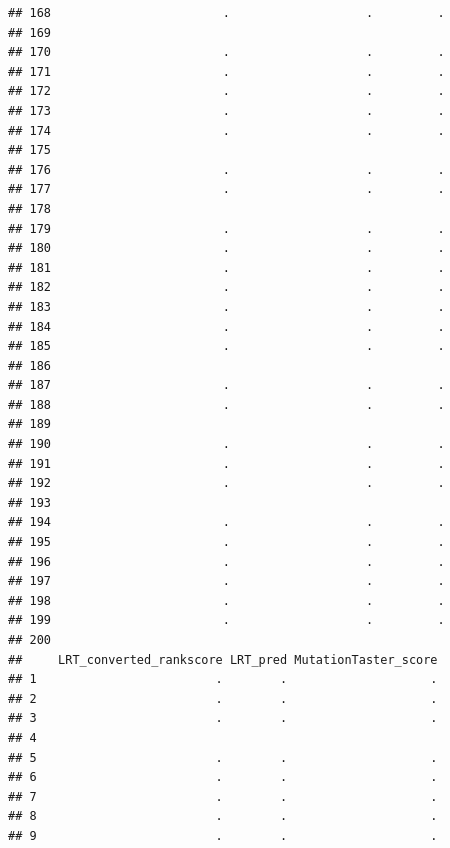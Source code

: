 \documentclass[
]{article}
\begin{document}
\begin{verbatim}
## 168                        .                   .         .
## 169                                                       
## 170                        .                   .         .
## 171                        .                   .         .
## 172                        .                   .         .
## 173                        .                   .         .
## 174                        .                   .         .
## 175                                                       
## 176                        .                   .         .
## 177                        .                   .         .
## 178                                                       
## 179                        .                   .         .
## 180                        .                   .         .
## 181                        .                   .         .
## 182                        .                   .         .
## 183                        .                   .         .
## 184                        .                   .         .
## 185                        .                   .         .
## 186                                                       
## 187                        .                   .         .
## 188                        .                   .         .
## 189                                                       
## 190                        .                   .         .
## 191                        .                   .         .
## 192                        .                   .         .
## 193                                                       
## 194                        .                   .         .
## 195                        .                   .         .
## 196                        .                   .         .
## 197                        .                   .         .
## 198                        .                   .         .
## 199                        .                   .         .
## 200                                                       
##     LRT_converted_rankscore LRT_pred MutationTaster_score
## 1                         .        .                    .
## 2                         .        .                    .
## 3                         .        .                    .
## 4                                                        
## 5                         .        .                    .
## 6                         .        .                    .
## 7                         .        .                    .
## 8                         .        .                    .
## 9                         .        .                    .

\end{verbatim}
\end{document}
